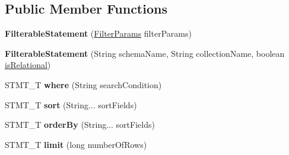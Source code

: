 \subsection*{Public Member Functions}
\begin{DoxyCompactItemize}
\item 
\mbox{\label{classcom_1_1mysql_1_1cj_1_1xdevapi_1_1_filterable_statement_a1f4bdf85b4c7e6abd086fe6b8d168b66}} 
{\bfseries Filterable\+Statement} (\mbox{\hyperlink{classcom_1_1mysql_1_1cj_1_1xdevapi_1_1_filter_params}{Filter\+Params}} filter\+Params)
\item 
\mbox{\label{classcom_1_1mysql_1_1cj_1_1xdevapi_1_1_filterable_statement_ab040aebeabb9d97f1ea205bc9c4c4230}} 
{\bfseries Filterable\+Statement} (String schema\+Name, String collection\+Name, boolean \mbox{\hyperlink{classcom_1_1mysql_1_1cj_1_1xdevapi_1_1_filterable_statement_a0fc92f86e2ee374cbf5c7fe66d7c7dea}{is\+Relational}})
\item 
\mbox{\label{classcom_1_1mysql_1_1cj_1_1xdevapi_1_1_filterable_statement_a358165df9da77ebe27c3b18414a13747}} 
S\+T\+M\+T\+\_\+T {\bfseries where} (String search\+Condition)
\item 
\mbox{\label{classcom_1_1mysql_1_1cj_1_1xdevapi_1_1_filterable_statement_ad2f31a6534645c0b82b1c71693ddd8f6}} 
S\+T\+M\+T\+\_\+T {\bfseries sort} (String... sort\+Fields)
\item 
\mbox{\label{classcom_1_1mysql_1_1cj_1_1xdevapi_1_1_filterable_statement_a33cd3395bdf36bd42e3e5c6c25b79d0e}} 
S\+T\+M\+T\+\_\+T {\bfseries order\+By} (String... sort\+Fields)
\item 
\mbox{\label{classcom_1_1mysql_1_1cj_1_1xdevapi_1_1_filterable_statement_a563edf1d31caf5e5244fef079b37604f}} 
S\+T\+M\+T\+\_\+T {\bfseries limit} (long number\+Of\+Rows)
\item 
\mbox{\label{classcom_1_1mysql_1_1cj_1_1xdevapi_1_1_filterable_statement_ac3e56b485f1b7ec38f0d3d57313b0e3d}} 

\end{DoxyCompactItemize}
